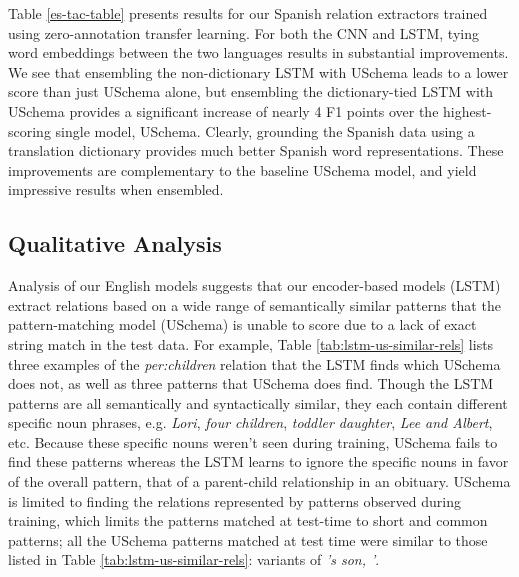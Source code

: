 Table \ref{es-tac-table} presents results for our Spanish relation extractors trained using zero-annotation transfer learning. For both the CNN and LSTM, tying word embeddings between the two languages results in substantial improvements. We see that ensembling the non-dictionary LSTM with USchema leads to a lower score than just USchema alone, but ensembling the dictionary-tied LSTM with USchema provides a significant increase of nearly 4 F1 points over the highest-scoring single model, USchema. Clearly, grounding the Spanish data using a translation dictionary provides much better Spanish word representations. These improvements are complementary to the baseline USchema model, and yield impressive results when ensembled. 


\subsection{Qualitative Analysis \label{sec:qual-anal}}

Analysis of our English models suggests that our encoder-based models (LSTM) extract relations based on a wide range of semantically similar patterns that the pattern-matching model (USchema) is unable to score due to a lack of exact string match in the test data. For example, Table \ref{tab:lstm-us-similar-rels} lists three examples of the \emph{per:children} relation that the LSTM finds which USchema does not, as well as three patterns that USchema does find. Though the LSTM patterns are all semantically and syntactically similar, they each contain different specific noun phrases, e.g. \emph{Lori}, \emph{four children}, \emph{toddler daughter}, \emph{Lee and Albert}, etc. Because these specific nouns weren't seen during training, USchema fails to find these patterns whereas the LSTM learns to ignore the specific nouns in favor of the overall pattern, that of a parent-child relationship in an obituary. USchema is limited to finding the relations represented by patterns observed during training, which limits the patterns matched at test-time to short and common patterns; all the USchema patterns matched at test time were similar to those listed in Table \ref{tab:lstm-us-similar-rels}: variants of \emph{'s son, '}. 


